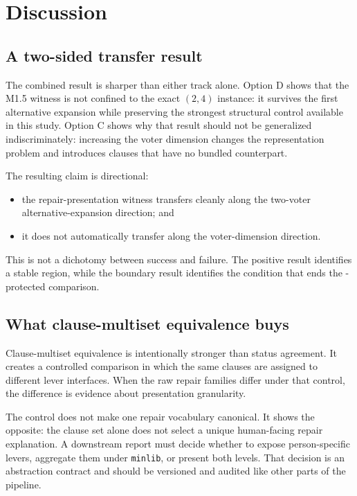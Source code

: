 \section{Discussion}\label{sec:discussion}

\subsection{A two-sided transfer result}

The combined result is sharper than either track alone.  Option D shows that
the M1.5 witness is not confined to the exact $(2,4)$ instance: it survives the
first alternative expansion while preserving the strongest structural control
available in this study.  Option C shows why that result should not be
generalized indiscriminately: increasing the voter dimension changes the
representation problem and introduces clauses that have no bundled
counterpart.

The resulting claim is directional:
\begin{itemize}
  \item the repair-presentation witness transfers cleanly along the
  two-voter alternative-expansion direction; and
  \item it does not automatically transfer along the voter-dimension direction.
\end{itemize}
This is not a dichotomy between success and failure.  The positive result
identifies a stable region, while the boundary result identifies the condition
that ends the \CM-protected comparison.

\subsection{What clause-multiset equivalence buys}

Clause-multiset equivalence is intentionally stronger than status agreement.
It creates a controlled comparison in which the same clauses are assigned to
different lever interfaces.  When the raw repair families differ under that
control, the difference is evidence about presentation granularity.

The control does not make one repair vocabulary canonical.  It shows the
opposite: the clause set alone does not select a unique human-facing repair
explanation.  A downstream report must decide whether to expose
person-specific levers, aggregate them under \texttt{minlib}, or present both
levels.  That decision is an abstraction contract and should be versioned and
audited like other parts of the pipeline.

